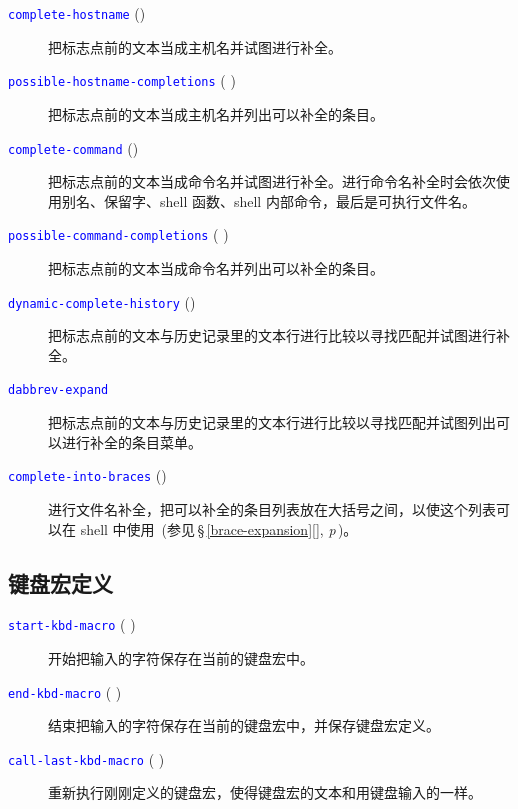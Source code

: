 \documentclass[openany,notitlepage]{book}
\newcommand{\code}[1]{\textcolor{blue}{{\tt #1}}}
\newcommand{\fullref}[1]{\,\S\,\ref{#1}[\nameref{#1}], \textit{p\pageref{#1}}\,}
\begin{document}
\begin{CJK}{UTF8}{song}
\begin{description}
    \item[\code{complete-hostname} ()] 把标志点前的文本当成主机名并试图进行补全。
    \item[\code{possible-hostname-completions} ( )] 把标志点前的文本当成主机名并列出可以补全的条目。
    \item[\code{complete-command} ()] 把标志点前的文本当成命令名并试图进行补全。进行命令名补全时会依次使用别名、保留字、shell 函数、shell 内部命令，最后是可执行文件名。
    \item[\code{possible-command-completions} ( \keystroke{!})] 把标志点前的文本当成命令名并列出可以补全的条目。
    \item[\code{dynamic-complete-history} ()] 把标志点前的文本与历史记录里的文本行进行比较以寻找匹配并试图进行补全。
    \item[\code{dabbrev-expand}] 把标志点前的文本与历史记录里的文本行进行比较以寻找匹配并试图列出可以进行补全的条目菜单。
    \item[\code{complete-into-braces} ()] 进行文件名补全，把可以补全的条目列表放在大括号之间，以使这个列表可以在 shell 中使用~(参见\fullref{brace-expansion})。
\end{description}

\subsection{键盘宏定义} %
\begin{description}
    \item[\code{start-kbd-macro} ( \keystroke{(})] 开始把输入的字符保存在当前的键盘宏中。
    \item[\code{end-kbd-macro} ( \keystroke{)})] 结束把输入的字符保存在当前的键盘宏中，并保存键盘宏定义。
    \item[\code{call-last-kbd-macro} ( )] 重新执行刚刚定义的键盘宏，使得键盘宏的文本和用键盘输入的一样。
\end{description}


\end{CJK}
\end{document}
